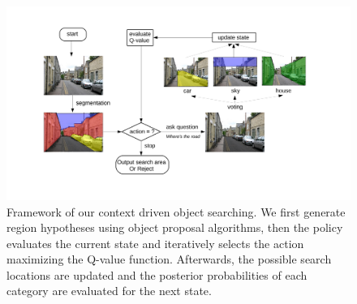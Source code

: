 %


\begin{figure}[htb]
\begin{center}
\includegraphics[width=\linewidth]{figures/flowchart_Q.pdf}
\caption{Framework of our context driven object searching. We first generate region hypotheses using object proposal algorithms, then the policy evaluates the current state and iteratively selects the action maximizing the Q-value function. Afterwards, the possible search locations are updated and the posterior probabilities of each category are evaluated for the next state.}
\label{fig:flowchart}
\end{center}
\end{figure}

